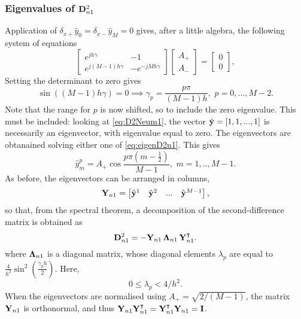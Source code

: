 \documentclass[11pt,twoside,a4paper,english]{book}
\newcommand{\dsp}{\delta_{x+}}
\newcommand{\dsm}{\delta_{x-}}
\begin{document}
\subsubsection{Eigenvalues of ${\bf D}^2_{n1}$}

Application of $\dsp \hat y_0 = \dsm \hat y_M = 0$ gives, after a little algebra, the following system of equations
\begin{equation}\label{eq:eigenD2n1}
\begin{bmatrix}
e^{jh\gamma} & -1 \\
e^{j(M-1)h\gamma} & -e^{-jMh\gamma}
\end{bmatrix}
\begin{bmatrix}
A_+ \\
A_-
\end{bmatrix}=
\begin{bmatrix}
0 \\
0
\end{bmatrix},
\end{equation}
Setting the determinant to zero gives
\begin{equation}\label{eq:EigenvaluesD2n1}
\sin ({(M-1)h\gamma}) = 0  \implies  \gamma_p = \frac{p \pi}{(M-1) h}, \,\, p = 0,...,M-2.
\end{equation}
Note that the range for $p$ is now shifted, so to include the zero eigenvalue. This must be included: looking at \eqref{eq:D2Neum1}, the vector $\hat {\bf y} = [1,1,...,1]$ is necessarily an eigenvector, with eigenvalue equal to zero. The eigenvectors are obtanained solving either one of \eqref{eq:eigenD2n1}. This gives
\begin{equation}
\hat y^p_m=A_+\cos\frac{p \pi \left( m-\frac{1}{2}\right)}{M-1}, \,\, m = 1,..,M-1.
\end{equation}
As before, the eigenvectors can be arranged in columns, 
\begin{equation}
{\bf Y}_{n1} = \begin{bmatrix}\hat {\bf y}^1 & \hat{\bf y}^2 & ... & \hat{\bf y}^{M-1}\end{bmatrix},
\end{equation}
so that, from the spectral theorem, a decomposition of the second-difference matrix is obtained as
\begin{equation}\label{eq:DecompD2n1}
{\bf D}^{2}_{n1} = -{\bf Y}_{n1} \, {\bf \Lambda}_{n1} \, {\bf Y}^\intercal_{n1}.
\end{equation}
where ${{\bf \Lambda}_{n1}}$ is a diagonal matrix, whose diagonal elements $\lambda_p$ are  equal to $\frac{4}{h^2}\sin^2 \left( \frac{\gamma_p h}{2}\right)$. Here,
\begin{equation}\label{eq:BndLambdaD2n1}
0 \leq \lambda_p < 4/h^2.
\end{equation}
When the eigenvectors are normalised using $A_+ = \sqrt{2/(M-1)}$, the matrix ${\bf Y}_{n1}$ is orthonormal, and thus ${\bf Y}_{n1} {\bf Y}_{n1}^{\intercal}={\bf Y}_{n1}^\intercal {\bf Y}_{n1} = {\bf I}$.
\end{document}
